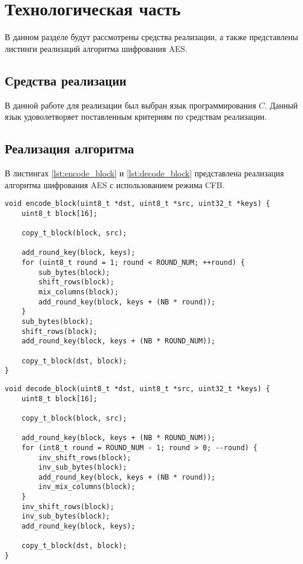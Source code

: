 \chapter{Технологическая часть}

В данном разделе будут рассмотрены средства реализации, а также представлены листинги реализаций алгоритма шифрования AES.

\section{Средства реализации}
В данной работе для реализации был выбран язык программирования $C$. Данный язык удоволетворяет поставленным критериям по средствам реализации.

\section{Реализация алгоритма}

В листингах \ref{lst:encode_block} и \ref{lst:decode_block} представлена реализация алгоритма шифрования AES с использованием режима CFB.

\begin{center}
    \captionsetup{justification=raggedright,singlelinecheck=off}
    \begin{lstlisting}[label=lst:encode_block,caption=Шифрование AES]
void encode_block(uint8_t *dst, uint8_t *src, uint32_t *keys) {
	uint8_t block[16];
	
	copy_t_block(block, src);
	
	add_round_key(block, keys);
	for (uint8_t round = 1; round < ROUND_NUM; ++round) {
		sub_bytes(block);
		shift_rows(block);
		mix_columns(block);
		add_round_key(block, keys + (NB * round));
	}
	sub_bytes(block);
	shift_rows(block);
	add_round_key(block, keys + (NB * ROUND_NUM));
	
	copy_t_block(dst, block);
}
\end{lstlisting}
\end{center}

\begin{center}
\captionsetup{justification=raggedright,singlelinecheck=off}
\begin{lstlisting}[label=lst:decode_block,caption=Дешифрование AES]
void decode_block(uint8_t *dst, uint8_t *src, uint32_t *keys) {
	uint8_t block[16];
	
	copy_t_block(block, src);
	
	add_round_key(block, keys + (NB * ROUND_NUM));
	for (int8_t round = ROUND_NUM - 1; round > 0; --round) {
		inv_shift_rows(block);
		inv_sub_bytes(block);
		add_round_key(block, keys + (NB * round));
		inv_mix_columns(block);
	}
	inv_shift_rows(block);
	inv_sub_bytes(block);
	add_round_key(block, keys);
	
	copy_t_block(dst, block);
}
\end{lstlisting}
\end{center}
\FloatBarrier

